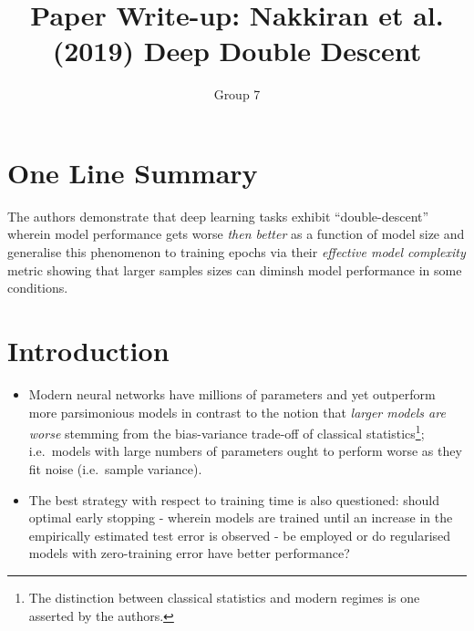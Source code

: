 \documentclass[]{article}
\title{Paper Write-up: Nakkiran et al. (2019) Deep Double Descent}
\author{Group 7}
\providecommand{\tightlist}{%
  \setlength{\itemsep}{0pt}\setlength{\parskip}{0pt}}
\begin{document}
\maketitle

\section{One Line Summary}

The authors demonstrate that deep learning tasks exhibit
``double-descent'' wherein model performance gets worse \emph{then
better} as a function of model size and generalise this phenomenon to
training epochs via their \emph{effective model complexity} metric
showing that larger samples sizes can diminsh model performance in some
conditions.

\section{Introduction}

\begin{itemize}
\tightlist
\item
  Modern neural networks have millions of parameters and yet outperform
  more parsimonious models in contrast to the notion that \emph{larger
  models are worse} stemming from the bias-variance trade-off of
  classical statistics\footnote{The distinction between classical
    statistics and modern regimes is one asserted by the authors.};
  i.e.~models with large numbers of parameters ought to perform worse as
  they fit noise (i.e.~sample variance).
\item
  The best strategy with respect to training time is also questioned:
  should optimal early stopping - wherein models are trained until an
  increase in the empirically estimated test error is observed - be
  employed or do regularised models with zero-training error have better
  performance?
\end{itemize}
\end{document}

